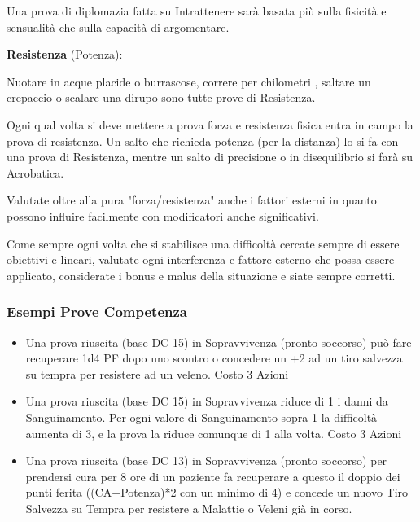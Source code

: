 \documentclass[a4paper,11pt,twoside,openany]{book}
\begin{document}
Una prova di diplomazia fatta su Intrattenere sarà basata più sulla fisicità e sensualità che sulla capacità di argomentare.

\textbf{Resistenza} (Potenza):

Nuotare in acque placide o burrascose, correre per chilometri , saltare un crepaccio o scalare una dirupo sono tutte prove di Resistenza.

Ogni qual volta si deve mettere a prova forza e resistenza fisica entra in campo la prova di resistenza.
Un salto che richieda potenza (per la distanza) lo si fa con una prova di Resistenza, mentre un salto di precisione o in disequilibrio si farà su Acrobatica.

Valutate oltre alla pura "forza/resistenza" anche i fattori esterni in quanto possono influire facilmente con modificatori anche significativi.

\bigskip

Come sempre ogni volta che si stabilisce una difficoltà cercate sempre di essere obiettivi e lineari, valutate ogni interferenza e fattore esterno che possa essere applicato, considerate i bonus e malus della situazione e siate sempre corretti.

\subsubsection{Esempi Prove Competenza}

\label{esempi-prove-competenza}

\begin{itemize}
	\item Una prova riuscita (base DC 15) in Sopravvivenza (pronto soccorso) può fare recuperare 1d4 PF dopo uno scontro o concedere un +2 ad un tiro salvezza su tempra per resistere ad un veleno. Costo 3 Azioni
	
	\item Una prova riuscita (base DC 15) in Sopravvivenza riduce di 1 i danni da Sanguinamento. Per ogni valore di Sanguinamento sopra 1 la difficoltà aumenta di 3, e la prova la riduce comunque di 1 alla volta. Costo 3 Azioni
\end{itemize}

\begin{itemize}
	\item Una prova riuscita (base DC 13) in Sopravvivenza (pronto soccorso) per prendersi cura per 8 ore di un paziente fa recuperare a questo il doppio dei punti ferita ((CA+Potenza)*2 con un minimo di 4) e concede un nuovo Tiro Salvezza su Tempra per resistere a Malattie o Veleni già in corso.
\end{itemize}
\end{document}
